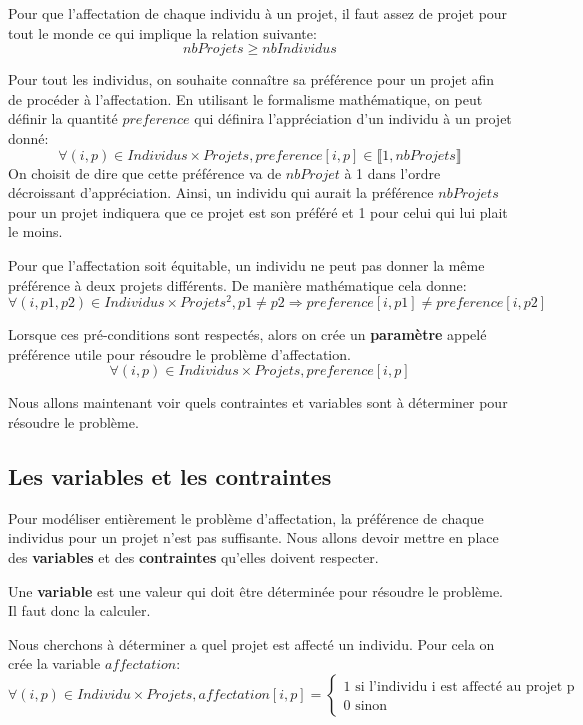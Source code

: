 \documentclass{polytech/polytech}
\begin{document}
Pour que l'affectation de chaque individu à un projet, il faut assez de projet pour tout le monde ce qui implique la relation suivante:
$$ nbProjets \geqslant nbIndividus$$

Pour tout les individus, on souhaite connaître sa préférence pour un projet afin de procéder à l'affectation. En utilisant le formalisme mathématique, on peut définir la quantité $preference$ qui définira l'appréciation d'un individu à un projet donné:
$$
\forall (i,p) \in Individus \times Projets,
preference[i,p] \in \llbracket 1, nbProjets \rrbracket
$$
On choisit de dire que cette préférence va de $nbProjet$ à 1 dans l'ordre décroissant d'appréciation. Ainsi, un individu qui aurait la préférence $nbProjets$ pour un projet indiquera que ce projet est son préféré et 1 pour celui qui lui plait le moins.

Pour que l'affectation soit équitable, un individu ne peut pas donner la même préférence à deux projets différents. De manière mathématique cela donne:
$$
\forall (i,p1,p2) \in Individus \times Projets^2 , p1 \neq p2 \Rightarrow preference[i,p1] \neq preference[i,p2]
$$

Lorsque ces pré-conditions sont respectés, alors on crée un \textbf{paramètre} appelé préférence utile pour résoudre le problème d'affectation.
$$
\forall (i,p) \in Individus \times Projets,
preference[i,p]
$$

Nous allons maintenant voir quels contraintes et variables sont à déterminer pour résoudre le problème.

\subsection{Les variables et les contraintes}

Pour modéliser entièrement le problème d'affectation, la préférence de chaque individus pour un projet n'est pas suffisante.
Nous allons devoir mettre en place des \textbf{ variables} et des \textbf{contraintes} qu'elles doivent respecter.

Une \textbf{variable} est une valeur qui doit être déterminée pour résoudre le problème. Il faut donc la calculer.

Nous cherchons à déterminer a quel projet est affecté un individu. Pour cela on crée la variable $affectation$:
$$
\forall (i,p) \in Individu\times Projets , affectation[i,p]=
\left\lbrace
\begin{array}{l}
1 \text{ si l'individu i est affecté au projet p} \\
0 \text{ sinon}
\end{array}
\right.
$$
\end{document}
